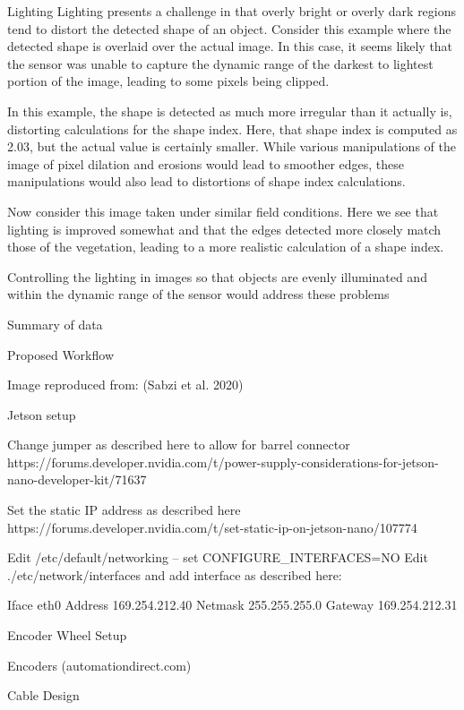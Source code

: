 \documentclass[letterpaper]{article}
\begin{document}
Lighting
Lighting presents a challenge in that overly bright or overly dark regions tend to distort the detected shape of an object. Consider this example where the detected shape is overlaid over the actual image. In this case, it seems likely that the sensor was unable to capture the dynamic range of the darkest to lightest portion of the image, leading to some pixels being clipped.



In this example, the shape is detected as much more irregular than it actually is, distorting calculations for the shape index. Here, that shape index is computed as 2.03, but the actual value is certainly smaller. While various manipulations of the image of pixel dilation and erosions would lead to smoother edges, these manipulations would also lead to distortions of shape index calculations.

Now consider this image taken under similar field conditions.  Here we see that lighting is improved somewhat and that the edges detected more closely match those of the vegetation, leading to a more realistic calculation of a shape index. 


Controlling the lighting in images so that objects are evenly illuminated and within the dynamic range of the sensor would address these problems

Summary of data

Proposed Workflow


Image reproduced from: (Sabzi et al. 2020)




Jetson setup

Change jumper as described here to allow for barrel connector
https://forums.developer.nvidia.com/t/power-supply-considerations-for-jetson-nano-developer-kit/71637

Set the static IP address as described here
https://forums.developer.nvidia.com/t/set-static-ip-on-jetson-nano/107774

Edit /etc/default/networking -- set CONFIGURE_INTERFACES=NO
Edit ./etc/network/interfaces and add interface as described here:

Iface eth0
Address 169.254.212.40
Netmask 255.255.255.0
Gateway 169.254.212.31

Encoder Wheel Setup

Encoders (automationdirect.com)

Cable Design
\end{document}
